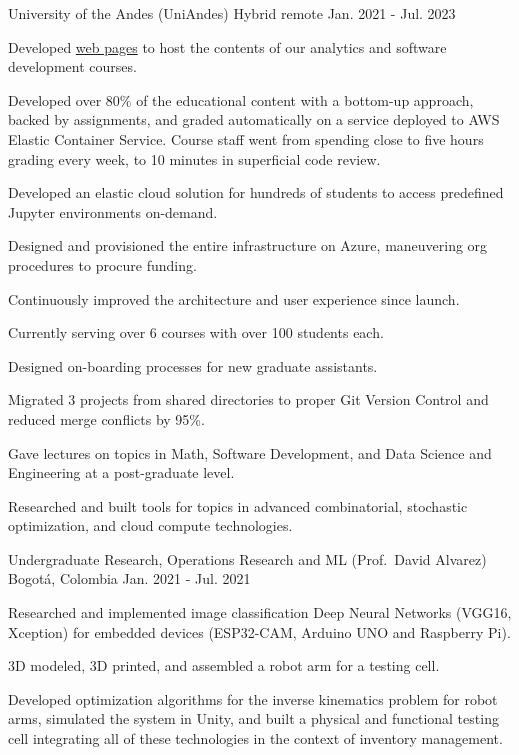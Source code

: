 \begin{cventries}
	{University of the Andes (UniAndes)} %
	{Hybrid remote} %
	{Jan. 2021 {-} Jul. 2023} %
	{
		\begin{cvitems} %
			\item {Developed \href{https://copa-uniandes.github.io/PAD-web-tutorials/intro.html}{web pages} to host the contents of our analytics and software development courses.}
			\item {Developed over 80\% of the educational content with a bottom-up approach, backed by assignments, and graded automatically on a service deployed to AWS Elastic Container Service. Course staff went from spending close to five hours grading every week, to 10 minutes in superficial code review.}
			\item {Developed an elastic cloud solution for hundreds of students to access predefined Jupyter environments on-demand.}
			\item {Designed and provisioned the entire infrastructure on Azure, maneuvering org procedures to procure funding.}
			\item {Continuously improved the architecture and user experience since launch.}
			\item {Currently serving over 6 courses with over 100 students each.}
			\item {Designed on-boarding processes for new graduate assistants.}
			\item {Migrated 3 projects from shared directories to proper Git Version Control and reduced merge conflicts by 95\%.}
			\item {Gave lectures on topics in Math, Software Development, and Data Science and Engineering at a post-graduate level.}
			\item {Researched and built tools for topics in advanced combinatorial, stochastic optimization, and cloud compute technologies.}
		\end{cvitems}
	}

	{Undergraduate Research, Operations Research and ML (Prof.\ David Alvarez)} %
	{Bogotá, Colombia} %
	{Jan. 2021 {-} Jul. 2021} %
	{
		\begin{cvitems} %
			\item {Researched and implemented image classification Deep Neural Networks (VGG16, Xception) for embedded devices (ESP32-CAM, Arduino UNO and Raspberry Pi).}
			\item {3D modeled, 3D printed, and assembled a robot arm for a testing cell.}
			\item {Developed optimization algorithms for the inverse kinematics problem for robot arms, simulated the system in Unity, and built a physical and functional testing cell integrating all of these technologies in the context of inventory management.}
		\end{cvitems}
	}


\end{cventries}
